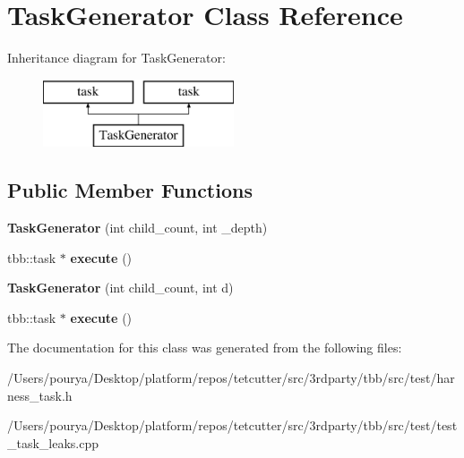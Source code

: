 \hypertarget{classTaskGenerator}{}\section{Task\+Generator Class Reference}
\label{classTaskGenerator}
Inheritance diagram for Task\+Generator\+:\begin{figure}[H]
\begin{center}
\leavevmode
\includegraphics[height=2.000000cm]{classTaskGenerator}
\end{center}
\end{figure}
\subsection*{Public Member Functions}
\begin{DoxyCompactItemize}
\item 
\hypertarget{classTaskGenerator_adcd198e2a44a7723634af78a1ab2521b}{}{\bfseries Task\+Generator} (int child\+\_\+count, int \+\_\+depth)\label{classTaskGenerator_adcd198e2a44a7723634af78a1ab2521b}

\item 
\hypertarget{classTaskGenerator_a6e3f9f6ae485f8d08dbd4bcb978dd733}{}tbb\+::task $\ast$ {\bfseries execute} ()\label{classTaskGenerator_a6e3f9f6ae485f8d08dbd4bcb978dd733}

\item 
\hypertarget{classTaskGenerator_a6aa9a44c768ab1c2e137468ff5e5ca81}{}{\bfseries Task\+Generator} (int child\+\_\+count, int d)\label{classTaskGenerator_a6aa9a44c768ab1c2e137468ff5e5ca81}

\item 
\hypertarget{classTaskGenerator_a6e3f9f6ae485f8d08dbd4bcb978dd733}{}tbb\+::task $\ast$ {\bfseries execute} ()\label{classTaskGenerator_a6e3f9f6ae485f8d08dbd4bcb978dd733}

\end{DoxyCompactItemize}


The documentation for this class was generated from the following files\+:\begin{DoxyCompactItemize}
\item 
/\+Users/pourya/\+Desktop/platform/repos/tetcutter/src/3rdparty/tbb/src/test/harness\+\_\+task.\+h\item 
/\+Users/pourya/\+Desktop/platform/repos/tetcutter/src/3rdparty/tbb/src/test/test\+\_\+task\+\_\+leaks.\+cpp\end{DoxyCompactItemize}
